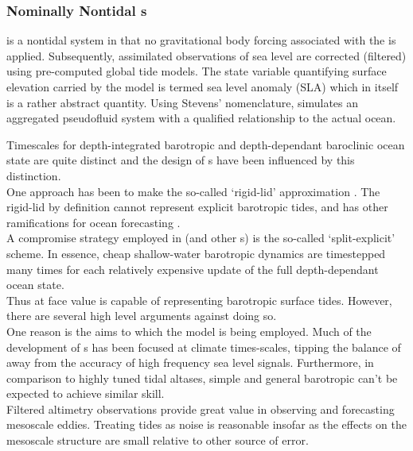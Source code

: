 \subsubsection{Nominally Nontidal \OGCM{}s}
\label{S:nontidal}

\BL{} is a nontidal system in that no gravitational body forcing associated with the \ATGP{} is applied.   Subsequently, assimilated observations of sea level are corrected (filtered) using pre-computed global tide models.  The state variable quantifying surface elevation carried by the model is termed sea level anomaly (SLA) which in itself is a rather abstract quantity. Using Stevens' nomenclature, \BL{} simulates an aggregated pseudofluid system with a qualified relationship to the actual ocean.


Timescales for depth-integrated barotropic and depth-dependant baroclinic ocean state are quite distinct and the design of \OGCM{}s have been influenced by this distinction. \\
One approach has been to make the so-called `rigid-lid' approximation \cite[pp128]{gill1982atmosphere}. 
The rigid-lid by definition cannot represent explicit barotropic tides, and has other ramifications for ocean forecasting \cite[pp19]{Griffies:2004vs}.\\


A compromise strategy employed in \MOM{} (and other \OGCM{}s) is the so-called `split-explicit' scheme.    
In essence, cheap shallow-water barotropic dynamics are timestepped many times for each relatively expensive update of the full depth-dependant ocean state.  \\
Thus \MOM{} at face value is capable of representing barotropic surface tides.   However, there are several high level arguments against doing so.\\
One reason is the aims to which the model is being employed.  Much of the development of \OGCM{}s has been focused at climate times-scales, tipping the balance of away from the accuracy of high frequency sea level signals.   
Furthermore, in comparison to highly tuned tidal altases, simple and general barotropic can't be expected to achieve similar skill.\\

Filtered altimetry observations provide great value in observing and forecasting mesoscale eddies.
Treating tides as noise is reasonable insofar as the effects on the mesoscale structure are small relative to other source of error.\\

